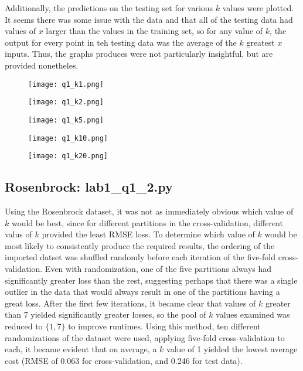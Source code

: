 Additionally, the predictions on the testing set for various $k$ values were plotted. It seems there was some issue with the data and that all of the testing data had values of $x$ larger than the values in the training set, so for any value of $k$, the output for every point in teh testing data was the average of the $k$ greatest $x$ inputs. Thus, the graphs produces were not particularly insightful, but are provided nonetheles.

\begin{figure}[h]
\texttt{[image: q1\_k1.png]}
\centering
\end{figure}

\begin{figure}[p]
\texttt{[image: q1\_k2.png]}
\centering
\end{figure}


\begin{figure}[p]
\texttt{[image: q1\_k5.png]}
\centering
\end{figure}

\begin{figure}[p]
\texttt{[image: q1\_k10.png]}
\centering
\end{figure}

\begin{figure}[h !]
\texttt{[image: q1\_k20.png]}
\centering
\end{figure}
\pagebreak

\subsection{Rosenbrock: lab1\_q1\_2.py}
Using the Rosenbrock dataset, it was not as immediately obvious which value of $k$ would be best, since for different partitions in the cross-validation, different valus of $k$ provided the least RMSE loss. To determine which value of $k$ would be most likely to consistently produce the required results, the ordering of the imported datset was shuffled randomly before each iteration of the five-fold cross-validation. Even with randomization, one of the five partitions always had significantly greater loss than the rest, suggesting perhaps that there was a single outlier in the data that would always result in one of the partitions having a great loss. After the first few iterations, it became clear that values of $k$ greater than 7 yielded significantly greater losses, so the pool of $k$ values examined was reduced to $\{1,7\}$ to improve runtimes. Using this method, ten different randomizations of the dataset were used, applying five-fold cross-validation to each, it became evident that on average, a $k$ value of 1 yielded the lowest average cost (RMSE of 0.063 for cross-validation, and 0.246 for test data).

